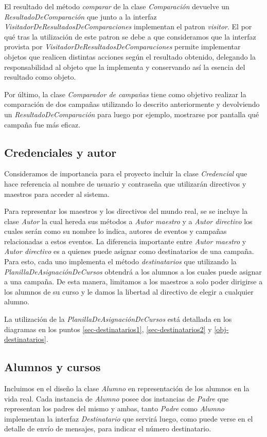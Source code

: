 \documentclass[a4paper, 10pt, twoside]{article}
\begin{document}
El resultado del método \textit{comparar} de la clase \textit{Comparación} devuelve un \textit{ResultadoDeComparación} 
que junto a la interfaz \textit{VisitadorDeResultadosDeComparaciones} implementan el patron \textit{visitor}. El por qué 
tras la utilización de este patron se debe a que consideramos que la interfaz provista por 
\textit{VisitadorDeResultadosDeComparaciones} permite implementar objetos que realicen distintas acciones según el 
resultado obtenido, delegando la responsabilidad al objeto que la implementa y conservando así la esencia del resultado 
como objeto.

Por último, la clase \textit{Comparador de campañas} tiene como objetivo realizar la comparación de dos campañas utilizando 
lo descrito anteriormente y devolviendo un \textit{ResultadoDeComparación} para luego por ejemplo, 
mostrarse por pantalla qué campaña fue más eficaz.

\subsection{Credenciales y autor}
Consideramos de importancia para el proyecto incluir la clase \textit{Credencial} que hace referencia al nombre de usuario y 
contraseña que utilizarán directivos y maestros para acceder al sistema.

Para representar los maestros y los directivos del mundo real, se se incluye la clase \textit{Autor} la cual hereda 
sus métodos a \textit{Autor maestro} y a \textit{Autor directivo} los cuales serán como su nombre lo indica, autores 
de eventos y campañas relacionadas a estos eventos. La diferencia importante entre \textit{Autor maestro} y 
\textit{Autor directivo} es a quienes puede asignar como destinatarios de una campaña. Para esto, cada uno implementa 
el método \textit{destinatarios} que utilizando la \textit{PlanillaDeAsignaciónDeCursos} obtendrá a los alumnos 
a los cuales puede asignar a una campaña. De esta manera, limitamos a los maestros a solo poder dirigirse a los alumnos 
de su curso y le damos la libertad al directivo de elegir a cualquier alumno.

La utilización de la \textit{PlanillaDeAsignaciónDeCursos} está detallada en los diagramas en los puntos 
\ref{sec-destinatarios1}, \ref{sec-destinatarios2} y \ref{obj-destinatarios}.


\subsection{Alumnos y cursos}
Incluimos en el diseño la clase \textit{Alumno} en representación de los alumnos en la vida real. Cada instancia de 
\textit{Alumno} posee dos instancias de \textit{Padre} que representan los padres del mismo y ambas, tanto 
\textit{Padre} como \textit{Alumno} implementan la interfaz \textit{Destinatario} que servirá luego, como puede 
verse en el detalle de envío de mensajes, para indicar el número destinatario.
\end{document}

